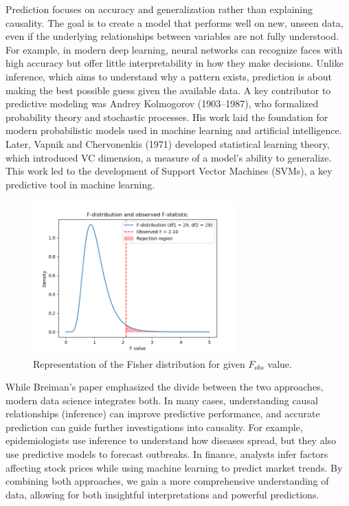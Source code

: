 \documentclass{book}
\begin{document}
Prediction focuses on accuracy and generalization rather than explaining causality. The goal is to create a model that performs well on new, unseen data, even if the underlying relationships between variables are not fully understood. For example, in modern deep learning, neural networks can recognize faces with high accuracy but offer little interpretability in how they make decisions. Unlike inference, which aims to understand why a pattern exists, prediction is about making the best possible guess given the available data. A key contributor to predictive modeling was Andrey Kolmogorov (1903–1987), who formalized probability theory and stochastic processes. His work laid the foundation for modern probabilistic models used in machine learning and artificial intelligence. Later, Vapnik and Chervonenkis (1971) developed statistical learning theory, which introduced VC dimension, a measure of a model’s ability to generalize. This work led to the development of Support Vector Machines (SVMs), a key predictive tool in machine learning.\\

\begin{figure}[ht]
    \centering
    \includegraphics[width=0.7\textwidth]{figures/chapter4/f_distribution.png}
    \caption{Representation of the Fisher distribution for given $F_{obs}$ value.}
    \label{fig:f_dist}
\end{figure}

While Breiman’s paper emphasized the divide between the two approaches, modern data science integrates both. In many cases, understanding causal relationships (inference) can improve predictive performance, and accurate prediction can guide further investigations into causality. For example, epidemiologists use inference to understand how diseases spread, but they also use predictive models to forecast outbreaks. In finance, analysts infer factors affecting stock prices while using machine learning to predict market trends. By combining both approaches, we gain a more comprehensive understanding of data, allowing for both insightful interpretations and powerful predictions.
\end{document}
